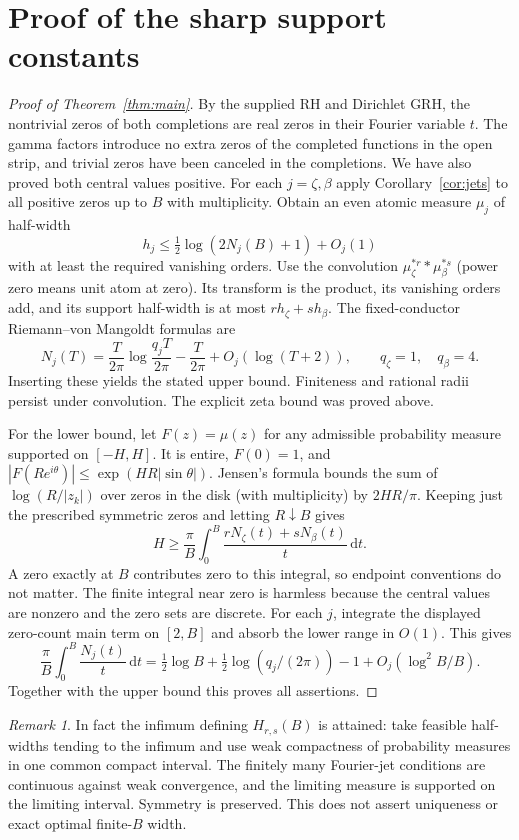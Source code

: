 \documentclass[11pt]{article}
\theoremstyle{remark}\newtheorem{remark}[theorem]{Remark}
\newcommand{\dd}{\,\mathrm d}
\begin{document}
\section{Proof of the sharp support constants}
\begin{proof}[Proof of Theorem~\ref{thm:main}]
By the supplied RH and Dirichlet GRH, the nontrivial zeros of both completions are real zeros in their Fourier variable $t$. The gamma factors introduce no extra zeros of the completed functions in the open strip, and trivial zeros have been canceled in the completions. We have also proved both central values positive. For each $j=\zeta,\beta$ apply Corollary~\ref{cor:jets} to all positive zeros up to $B$ with multiplicity. Obtain an even atomic measure $\mu_j$ of half-width
\[
 h_j\le\tfrac12\log(2N_j(B)+1)+O_j(1)
\]
with at least the required vanishing orders. Use the convolution $\mu_\zeta^{*r}*\mu_\beta^{*s}$ (power zero means unit atom at zero). Its transform is the product, its vanishing orders add, and its support half-width is at most $rh_\zeta+sh_\beta$. The fixed-conductor Riemann--von Mangoldt formulas \cite{titchmarsh,davenport} are
\[
 N_j(T)=\frac{T}{2\pi}\log\frac{q_jT}{2\pi}-\frac{T}{2\pi}+O_j(\log(T+2)),
 \qquad q_\zeta=1,\quad q_\beta=4.
\]
Inserting these yields the stated upper bound. Finiteness and rational radii persist under convolution. The explicit zeta bound was proved above.

For the lower bound, let $F(z)=\widehat\mu(z)$ for any admissible probability measure supported on $[-H,H]$. It is entire, $F(0)=1$, and $|F(Re^{i\theta})|\le\exp(HR|\sin\theta|)$. Jensen's formula bounds the sum of $\log(R/|z_k|)$ over zeros in the disk (with multiplicity) by $2HR/\pi$. Keeping just the prescribed symmetric zeros and letting $R\downarrow B$ gives
\begin{equation}\label{eq:jensen}
 H\ge\frac\pi B\int_0^B\frac{rN_\zeta(t)+sN_\beta(t)}{t}\dd t.
\end{equation}
A zero exactly at $B$ contributes zero to this integral, so endpoint conventions do not matter. The finite integral near zero is harmless because the central values are nonzero and the zero sets are discrete. For each $j$, integrate the displayed zero-count main term on $[2,B]$ and absorb the lower range in $O(1)$. This gives
\[
 \frac\pi B\int_0^B\frac{N_j(t)}t\dd t
 =\tfrac12\log B+\tfrac12\log(q_j/(2\pi))-1+O_j(\log^2 B/B).
\]
Together with the upper bound this proves all assertions.
\end{proof}
\begin{remark}
In fact the infimum defining $H_{r,s}(B)$ is attained: take feasible half-widths tending to the infimum and use weak compactness of probability measures in one common compact interval. The finitely many Fourier-jet conditions are continuous against weak convergence, and the limiting measure is supported on the limiting interval. Symmetry is preserved. This does not assert uniqueness or exact optimal finite-$B$ width.
\end{remark}
\end{document}

